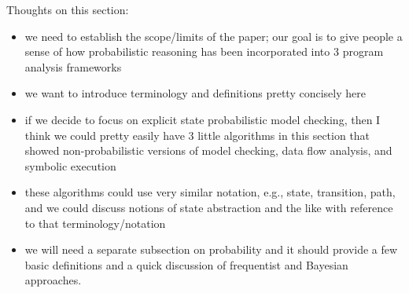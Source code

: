 Thoughts on this section:
\begin{itemize}
\item we need to establish the scope/limits of the paper; our goal is to give people a sense of how probabilistic reasoning has been incorporated into 3 program analysis frameworks
\item we want to introduce terminology and definitions pretty concisely here
\item if we decide to focus on explicit state probabilistic model checking, then I think we could pretty easily have 3 little algorithms in this section that showed non-probabilistic versions of model checking, data flow analysis, and symbolic execution
\item these algorithms could use very similar notation, e.g., state, transition, path, and we could discuss notions of state abstraction and the like with reference to that terminology/notation
\item we will need a separate subsection on probability and it should provide a few basic definitions and a quick discussion of frequentist and Bayesian approaches.
\end{itemize}
